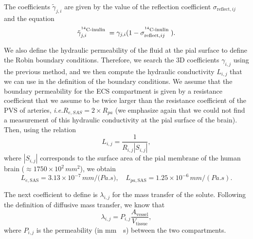 \documentclass[a4paper,11pt]{article}
\newcommand{\ie}{\emph{i.e.}\;}
\newcommand{\1}{^{(1)}}
\newcommand{\2}{^{(2)}}
\newcommand{\abs}[1]{\left\lvert#1\right\rvert}
\newcommand{\Cinulin}{$\prescript{14}{}{\text{C}}$-inulin }
\begin{document}
The coefficients $\tilde \gamma_{j , i}$ are given by the value of the reflection coefficient $\sigma_{\text{reflect},ij}$ and the equation
\begin{equation}
    \tilde \gamma^\text{\Cinulin}_{j, i} =  \gamma_{j, i}(1-\sigma_{\text{reflect},ij}^\text{\Cinulin}).
    \label{eq:gamma-tilde}
\end{equation}

We also define the hydraulic permeability of the fluid at the pial surface to define the Robin boundary conditions. 
Therefore, we search the 3D coefficients $\gamma_{i,j}$ using the previous method, and we then compute the hydraulic conductivity $L_{i,j}$ that we can use in the definition of the boundary conditions. 
We assume that the boundary permeability for the ECS compartment is given by a resistance coefficient that we assume to be twice larger than the resistance coefficient of the PVS of arteries, \ie $R_{e, SAS} = 2 \times R_{pa}$ (we emphasize again that we could not find a measurement of this hydraulic conductivity at the pial surface of the brain). 
Then, using the relation
\[
L_{i,j} = \frac{1}{R_{i,j}\abs{S_{i,j}}},
\]
where $\abs{S_{i,j}}$ corresponds to the surface area of the pial membrane of the human brain ($\approx 1750 \times 10^2 \, \si{mm^2}$), we obtain
\[
L_{e,\text{SAS}} = 3.13 \times 10^{-7} \, \si{mm/(Pa.s}),\quad L_{pa,\text{SAS}} = 1.25 \times 10^{-6} \, \si{mm/(Pa.s)}.
\]

The next coefficient to define is $\lambda_{i, j}$ for the mass transfer of the solute. Following the definition of diffusive mass transfer, we know that 
\begin{equation}
    \lambda_{i, j} =  P_{i, j} \frac{A_\text{vessel}}{V_\text{tissue}},
\end{equation}
where $P_{i,j}$ is the permeability (in \si{mm \per \second}) between the two compartments.
\end{document}
